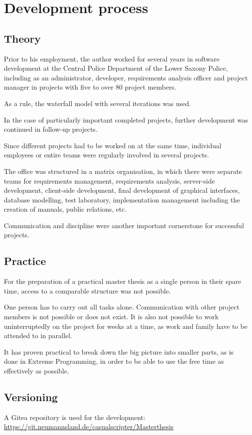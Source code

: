 \chapter{Development process}
\label{chap:devproc}

\section{Theory}

Prior to his employment, the author worked for several years in software development at the Central Police Department of the Lower Saxony Police, including as an administrator, developer, requirements analysis officer and project manager in projects with five to over 80 project members.

As a rule, the waterfall model with several iterations was used.

In the case of particularly important completed projects, further development was continued in follow-up projects.

Since different projects had to be worked on at the same time, individual employees or entire teams were regularly involved in several projects.

The office was structured in a matrix organisation, in which there were separate teams for requirements management, requirements analysis, server-side development, client-side development, final development of graphical interfaces, database modelling, test laboratory, implementation management including the creation of manuals, public relations, etc.

Communication and discipline were another important cornerstone for successful projects.

\section{Practice}

For the preparation of a practical master thesis as a single person in their spare time, access to a comparable structure was not possible.

One person has to carry out all tasks alone. Communication with other project members is not possible or does not exist. It is also not possible to work uninterruptedly on the project for weeks at a time, as work and family have to be attended to in parallel.

It has proven practical to break down the big picture into smaller parts, as is done in Extreme Programming, in order to be able to use the free time as effectively as possible.

\section{Versioning}

A Gitea repository is used for the development: \url{https://git.neumannsland.de/casualscripter/Masterthesis}